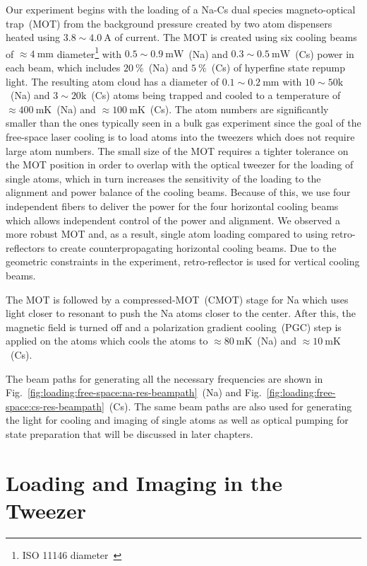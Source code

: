 Our experiment begins with the loading of a Na-Cs dual species magneto-optical trap~(MOT)
from the background pressure created by two atom dispensers
heated using $3.8\sim4.0~\mathrm{A}$ of current.
The MOT is created using six cooling beams of $\approx\!4~\mathrm{mm}$ diameter\footnote{
  ISO 11146 diameter~\cite{isotc_172sc_9_iso_2005,dataray_inc_wincamd_2018}}
with $0.5\sim0.9~\mathrm{mW}$~(Na) and $0.3\sim0.5~\mathrm{mW}$~(Cs)
power in each beam, which includes $20~\mathrm{\%}$~(Na)
and $5~\mathrm{\%}$~(Cs) of hyperfine state repump light.
The resulting atom cloud has a diameter of $0.1\sim0.2~\mathrm{mm}$
with $10\sim50\mathrm{k}$~(Na) and $3\sim20\mathrm{k}$~(Cs) atoms being trapped
and cooled to a temperature of $\approx\!400~\mathrm{mK}$~(Na)
and $\approx\!100~\mathrm{mK}$~(Cs).
The atom numbers are significantly smaller than the ones typically seen in a bulk gas experiment
since the goal of the free-space laser cooling is to load atoms into the tweezers
which does not require large atom numbers.
The small size of the MOT requires a tighter tolerance on the MOT position
in order to overlap with the optical tweezer for the loading of single atoms,
which in turn increases the sensitivity of the loading to the alignment
and power balance of the cooling beams.
Because of this, we use four independent fibers to deliver the power
for the four horizontal cooling beams which allows independent control
of the power and alignment.
We observed a more robust MOT and, as a result, single atom loading
compared to using retro-reflectors to create counterpropagating horizontal cooling beams.
Due to the geometric constraints in the experiment,
retro-reflector is used for vertical cooling beams.

The MOT is followed by a compressed-MOT~(CMOT) stage for Na
which uses light closer to resonant to push the Na atoms closer to the center.
After this, the magnetic field is turned off and
a polarization gradient cooling~(PGC) step is applied on the atoms
which cools the atoms to $\approx\!80~\mathrm{mK}$~(Na)
and $\approx\!10~\mathrm{mK}$~(Cs).

The beam paths for generating all the necessary frequencies are shown in
Fig.~\ref{fig:loading:free-space:na-res-beampath}~(Na) and
Fig.~\ref{fig:loading:free-space:cs-res-beampath}~(Cs).
The same beam paths are also used for generating the light for cooling
and imaging of single atoms as well as optical pumping for state preparation
that will be discussed in later chapters.

\section{Loading and Imaging in the Tweezer}
\label{ch:loading:loading}

